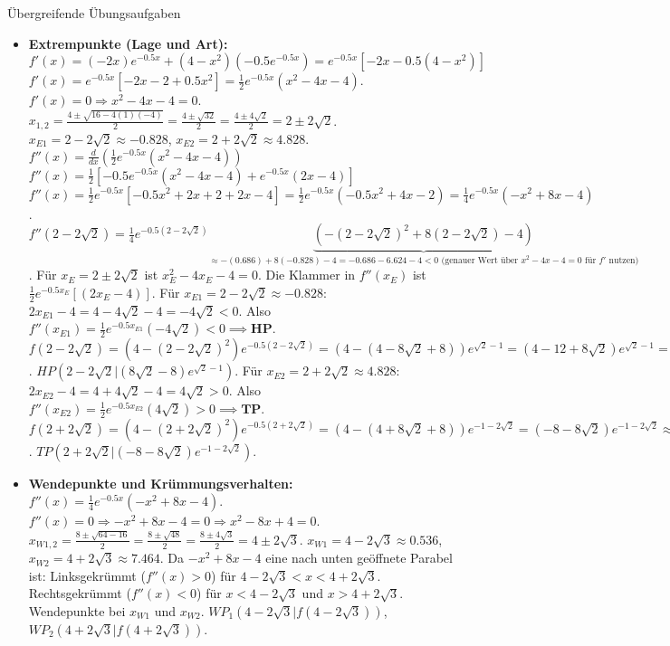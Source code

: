 \begin{loesungsumgebung}{Übergreifende Übungsaufgaben}
\begin{enumerate}
\begin{itemize}
        \item \textbf{Extrempunkte (Lage und Art):}
        $f'(x) = (-2x)e^{-0.5x} + (4-x^2)(-0.5e^{-0.5x}) = e^{-0.5x}[-2x - 0.5(4-x^2)]$
        $f'(x) = e^{-0.5x}[-2x - 2 + 0.5x^2] = \frac{1}{2}e^{-0.5x}(x^2 - 4x - 4)$.
        $f'(x)=0 \Rightarrow x^2 - 4x - 4 = 0$.
        $x_{1,2} = \frac{4 \pm \sqrt{16-4(1)(-4)}}{2} = \frac{4 \pm \sqrt{32}}{2} = \frac{4 \pm 4\sqrt{2}}{2} = 2 \pm 2\sqrt{2}$.
        $x_{E1} = 2 - 2\sqrt{2} \approx -0.828$, $x_{E2} = 2 + 2\sqrt{2} \approx 4.828$.
        $f''(x) = \frac{d}{dx}\left(\frac{1}{2}e^{-0.5x}(x^2 - 4x - 4)\right)$
        $f''(x) = \frac{1}{2}[-0.5e^{-0.5x}(x^2-4x-4) + e^{-0.5x}(2x-4)]$
        $f''(x) = \frac{1}{2}e^{-0.5x}[-0.5x^2+2x+2 + 2x-4] = \frac{1}{2}e^{-0.5x}(-0.5x^2+4x-2) = \frac{1}{4}e^{-0.5x}(-x^2+8x-4)$.
        $f''(2-2\sqrt{2}) = \frac{1}{4}e^{-0.5(2-2\sqrt{2})} \underbrace{(-(2-2\sqrt{2})^2+8(2-2\sqrt{2})-4)}_{ \approx - (0.686) + 8(-0.828) - 4 = -0.686 -6.624 -4 < 0 \text{ (genauer Wert über } x^2-4x-4=0 \text{ für } f' \text{ nutzen)}}$.
        Für $x_E = 2 \pm 2\sqrt{2}$ ist $x_E^2-4x_E-4=0$. Die Klammer in $f''(x_E)$ ist $\frac{1}{2}e^{-0.5x_E}[ (2x_E-4)]$.
        Für $x_{E1}=2-2\sqrt{2} \approx -0.828$: $2x_{E1}-4 = 4-4\sqrt{2}-4 = -4\sqrt{2} < 0$. Also $f''(x_{E1}) = \frac{1}{2}e^{-0.5x_{E1}}(-4\sqrt{2}) < 0 \implies \mathbf{HP}$.
        $f(2-2\sqrt{2}) = (4-(2-2\sqrt{2})^2)e^{-0.5(2-2\sqrt{2})} = (4-(4-8\sqrt{2}+8))e^{\sqrt{2}-1} = (4-12+8\sqrt{2})e^{\sqrt{2}-1} = (8\sqrt{2}-8)e^{\sqrt{2}-1} \approx 4.54$.
        $HP(2-2\sqrt{2} | (8\sqrt{2}-8)e^{\sqrt{2}-1})$.
        Für $x_{E2}=2+2\sqrt{2} \approx 4.828$: $2x_{E2}-4 = 4+4\sqrt{2}-4 = 4\sqrt{2} > 0$. Also $f''(x_{E2}) = \frac{1}{2}e^{-0.5x_{E2}}(4\sqrt{2}) > 0 \implies \mathbf{TP}$.
        $f(2+2\sqrt{2}) = (4-(2+2\sqrt{2})^2)e^{-0.5(2+2\sqrt{2})} = (4-(4+8\sqrt{2}+8))e^{-1-2\sqrt{2}} = (-8-8\sqrt{2})e^{-1-2\sqrt{2}} \approx -0.21$.
        $TP(2+2\sqrt{2} | (-8-8\sqrt{2})e^{-1-2\sqrt{2}})$.

        \item \textbf{Wendepunkte und Krümmungsverhalten:}
        $f''(x) = \frac{1}{4}e^{-0.5x}(-x^2+8x-4)$. $f''(x)=0 \Rightarrow -x^2+8x-4=0 \Rightarrow x^2-8x+4=0$.
        $x_{W1,2} = \frac{8 \pm \sqrt{64-16}}{2} = \frac{8 \pm \sqrt{48}}{2} = \frac{8 \pm 4\sqrt{3}}{2} = 4 \pm 2\sqrt{3}$.
        $x_{W1} = 4-2\sqrt{3} \approx 0.536$, $x_{W2} = 4+2\sqrt{3} \approx 7.464$.
        Da $-x^2+8x-4$ eine nach unten geöffnete Parabel ist:
        Linksgekrümmt ($f''(x)>0$) für $4-2\sqrt{3} < x < 4+2\sqrt{3}$.
        Rechtsgekrümmt ($f''(x)<0$) für $x < 4-2\sqrt{3}$ und $x > 4+2\sqrt{3}$.
        Wendepunkte bei $x_{W1}$ und $x_{W2}$.
        $WP_1(4-2\sqrt{3} | f(4-2\sqrt{3}))$, $WP_2(4+2\sqrt{3} | f(4+2\sqrt{3}))$.


\end{itemize}
\end{enumerate}
\end{loesungsumgebung}
